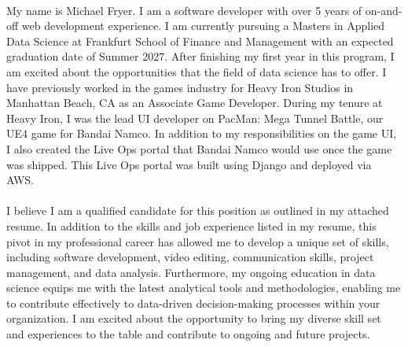 \paragraph{}
My name is Michael Fryer.
I am a software developer with over 5 years of on-and-off web development experience.
I am currently pursuing a Masters in Applied Data Science at Frankfurt School of Finance and Management with an expected graduation date of Summer 2027.
After finishing my first year in this program, I am excited about the opportunities that the field of data science has to offer.
I have previously worked in the games industry for Heavy Iron Studios in Manhattan Beach, CA as an Associate Game Developer.
During my tenure at Heavy Iron, I was the lead UI developer on PacMan: Mega Tunnel Battle, our UE4 game for Bandai Namco.
In addition to my responsibilities on the game UI, I also created the Live Ops portal that Bandai Namco would use once the game was shipped.
This Live Ops portal was built using Django and deployed via AWS\@.

\paragraph{}
I believe I am a qualified candidate for this position as outlined in my attached resume.
In addition to the skills and job experience listed in my resume, this pivot in my professional career has allowed me to develop a unique set of skills, including software development, video editing, communication skills, project management, and data analysis.
Furthermore, my ongoing education in data science equips me with the latest analytical tools and methodologies, enabling me to contribute effectively to data-driven decision-making processes within your organization.
I am excited about the opportunity to bring my diverse skill set and experiences to the table and contribute to ongoing and future projects.
